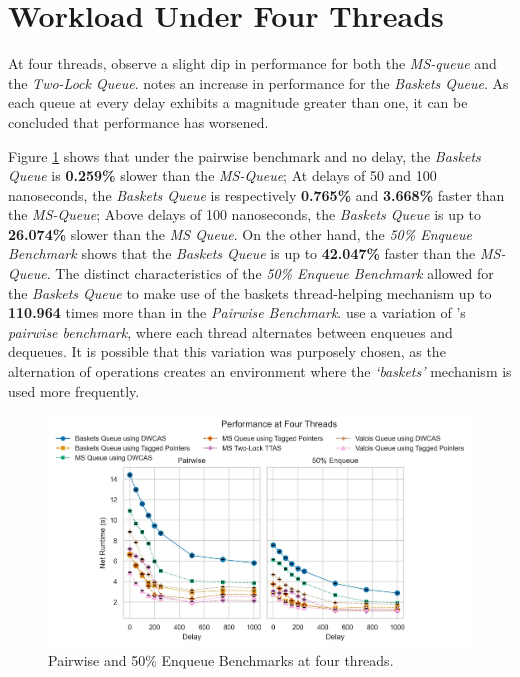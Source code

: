 \section{Workload Under Four Threads\label{sec:workload_four_threads}}

At four threads,
\citep{michael1996simple,hoffman2007baskets,ladan2008optimistic} observe a
slight dip in performance for both the \emph{MS-queue} and the \emph{Two-Lock
Queue}.
\citeauthor{hoffman2007baskets} notes an increase in performance for the
\emph{Baskets Queue}. As each queue at every delay exhibits a magnitude greater
than one, it can be concluded that performance has worsened.

Figure \ref{fig:perf_4_thread} shows that under the pairwise benchmark and no
delay, the \emph{Baskets Queue} is \textbf{0.259\%} slower than the \emph{MS-Queue};
At delays of 50 and 100 nanoseconds, the \emph{Baskets Queue} is
respectively \textbf{0.765\%} and \textbf{3.668\%} faster than the
\emph{MS-Queue}; Above delays of 100 nanoseconds, the \emph{Baskets Queue} is
up to \textbf{26.074\%} slower than the \emph{MS Queue}. 
On the other hand, the \emph{50\% Enqueue Benchmark} shows that the
\emph{Baskets Queue} is up to \textbf{42.047\%} faster than the
\emph{MS-Queue}. The distinct characteristics of the \emph{50\% Enqueue
Benchmark} allowed for the \emph{Baskets Queue} to make use of the baskets
thread-helping mechanism up to \textbf{110.964} times more than in the
\emph{Pairwise Benchmark}.
\citeauthor{hoffman2007baskets} use a variation of
\citeauthor{michael1996simple}'s \emph{pairwise benchmark}, where each thread
alternates between enqueues and dequeues. It is possible that this variation
was purposely chosen, as the alternation of operations creates an environment
where the \emph{`baskets'} mechanism is used more frequently.


\begin{figure}[!ht]
    \centering
    \includegraphics[width=1\textwidth]{images/plots/delay_thread_4.jpg}
    \caption{Pairwise and 50\% Enqueue Benchmarks at four threads.}
    \label{fig:perf_4_thread}
\end{figure}

